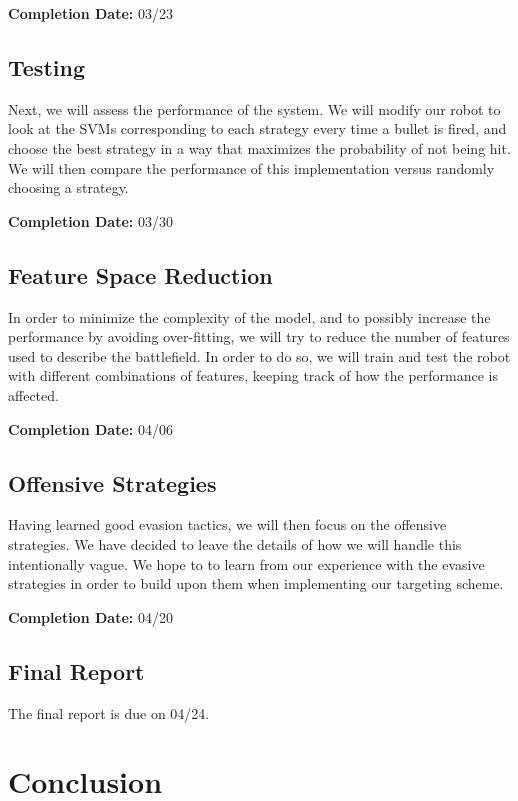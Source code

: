 \documentclass{article}
\theoremstyle{plain}
\theoremstyle{definition}
\theoremstyle{remark}
\begin{document}
{\bf Completion Date:}   03/23

\subsection*{Testing}
Next, we will assess the performance of the system. We will modify our robot to look at the SVMs corresponding to each strategy every time a bullet is fired, and choose the best strategy in a way that maximizes the probability of not being hit. We will then compare the performance of this implementation versus randomly choosing a strategy.

{\bf Completion Date:}  03/30

\subsection*{Feature Space Reduction}
In order to minimize the complexity of the model, and to possibly increase the performance by avoiding over-fitting, we will try to reduce the number of features used to describe the battlefield. In order to do so, we will train and test the robot with different combinations of features, keeping track of how the performance is affected. 

{\bf Completion Date:}  04/06

\subsection*{Offensive Strategies}
Having learned good evasion tactics, we will then focus on the offensive strategies. We have decided to leave the details of how we will handle this intentionally vague. We hope to to learn from our experience with the evasive strategies in order to build upon them when implementing our targeting scheme. 

{\bf Completion Date:}  04/20

\subsection*{Final Report}
The final report is due on 04/24.

\section{Conclusion}
\end{document}
